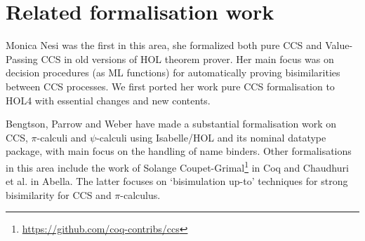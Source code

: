\section{Related formalisation work}
\label{s:rel}

Monica Nesi was the first in this area, she formalized both pure CCS \cite{Nesi:1992ve} and Value-Passing CCS
\cite{Nesi:2017wo} in old versions of HOL theorem prover.
Her main focus was on
 decision procedures (as ML functions) for
automatically proving bisimilarities between CCS
processes. We
first ported her work pure CCS formalisation to HOL4 with essential
changes and new contents.

Bengtson,  Parrow and Weber
have made a substantial formalisation work 
on CCS, $\pi$-calculi
\cite{bengtson2010formalising,bengtson2007completeness,bengtson2007formalising}
and $\psi$-calculi 
using Isabelle/HOL and its nominal datatype package, with main focus on the handling of name binders.
%
Other formalisations in this area include the work of Solange
Coupet-Grimal\footnote{\url{https://github.com/coq-contribs/ccs}} in Coq
and Chaudhuri et al.\;\cite{chaudhuri2015lightweight} in Abella. The
latter focuses on `bisimulation up-to' techniques for strong bisimilarity 
for CCS and $\pi$-calculus.
